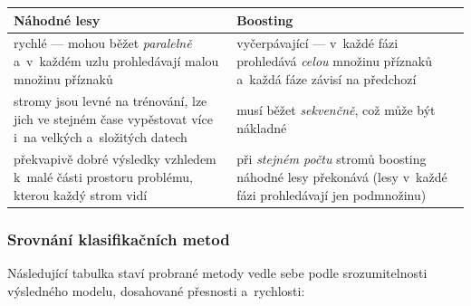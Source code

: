 \documentclass[11pt,a4paper]{article}
\theoremstyle{definition}
\begin{document}
\begin{center}
\small
\begin{tabular}{@{}p{7.6cm}p{8.0cm}@{}}
\toprule
\textbf{Náhodné lesy} & \textbf{Boosting} \\
\midrule
rychlé --- mohou běžet \emph{paralelně} a~v~každém uzlu prohledávají malou množinu příznaků
  & vyčerpávající --- v~každé fázi prohledává \emph{celou} množinu příznaků a~každá fáze
  závisí na předchozí \\
stromy jsou levné na trénování, lze jich ve stejném čase vypěstovat více i~na velkých
  a~složitých datech & musí běžet \emph{sekvenčně}, což může být nákladné \\
překvapivě dobré výsledky vzhledem k~malé části prostoru problému, kterou každý strom vidí
  & při \emph{stejném počtu} stromů boosting náhodné lesy překonává (lesy v~každé fázi
  prohledávají jen podmnožinu) \\
\bottomrule
\end{tabular}
\end{center}

\subsubsection{Srovnání klasifikačních metod}

Následující tabulka staví probrané metody vedle sebe podle srozumitelnosti výsledného modelu,
dosahované přesnosti a~rychlosti:
\end{document}
